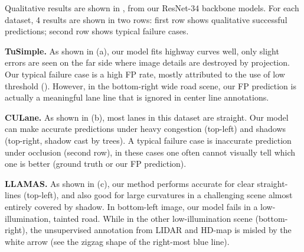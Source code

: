 \documentclass[10pt,twocolumn,letterpaper]{article}
\begin{document}
Qualitative results are shown in , from our ResNet-34 backbone models.
For each dataset, 4 results are shown in two rows: first row shows qualitative successful predictions; second row shows typical failure cases.

\noindent \textbf{TuSimple.} As shown in (a), our model fits highway curves well, only slight errors are seen on the far side where image details are destroyed by projection. Our typical failure case is a high FP rate, mostly attributed to the use of low threshold (). However, in the bottom-right wide road scene, our FP prediction is actually a meaningful lane line that is ignored in center line annotations.

\noindent \textbf{CULane.} As shown in (b), most lanes in this dataset are straight. Our model can make accurate predictions under heavy congestion (top-left) and shadows (top-right, shadow cast by trees).
A typical failure case is inaccurate prediction under occlusion (second row), in these cases one often cannot visually tell which one is better (ground truth or our FP prediction).

\noindent \textbf{LLAMAS.} As shown in (c), our method performs accurate for clear straight-lines (top-left), and also good for large curvatures in a challenging scene almost entirely covered by shadow. In bottom-left image, our model fails in a low-illumination, tainted road. While in the other low-illumination scene (bottom-right), the unsupervised annotation from LIDAR and HD-map is misled by the white arrow (see the zigzag shape of the right-most blue line).
\end{document}
